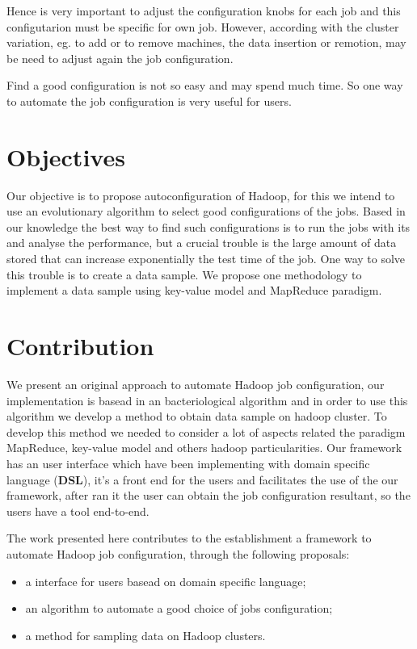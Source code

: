 Hence is very important to adjust the configuration knobs for each job and this
configutarion must be specific for own job. However, according with the cluster
variation, eg. to add or to remove machines, the data insertion or remotion,
may be need to adjust again the job configuration.

Find a good configuration is not so easy and may spend much time. So one way
to automate the job configuration is very useful for users.

\section{Objectives}
Our objective is to propose autoconfiguration of Hadoop, for this we intend to
use an evolutionary algorithm \cite{baudry} to select good configurations
of the jobs. Based in our knowledge the best way to find such configurations is
to run the jobs with its and analyse the performance, but a crucial trouble is
the large amount of data stored that can increase exponentially the test time of
the job. One way to solve this trouble is to create a data sample. We propose
one methodology to implement a data sample using key-value model and MapReduce
paradigm.

\section{Contribution}

We present an original approach to automate Hadoop job configuration, our
implementation is basead in an bacteriological algorithm \cite{baudry} and in
order to use this algorithm we develop a method to obtain data sample on
hadoop cluster. To develop this method we needed to consider a lot of
aspects related the paradigm MapReduce, key-value model and others hadoop
particularities. Our framework has an user interface which have been implementing
with domain specific language ({\bf DSL}), it's a front end for the users and
facilitates the use of the our framework, after ran it the user can obtain the
job configuration resultant, so the users have a tool end-to-end.

The work presented here contributes to the establishment a framework to automate
Hadoop job configuration, through the following proposals:
\begin{itemize}
	\item a interface for users basead on domain specific language;
	\item an algorithm to automate a good choice of jobs configuration;
	\item a method for sampling data on Hadoop clusters.
\end{itemize}

